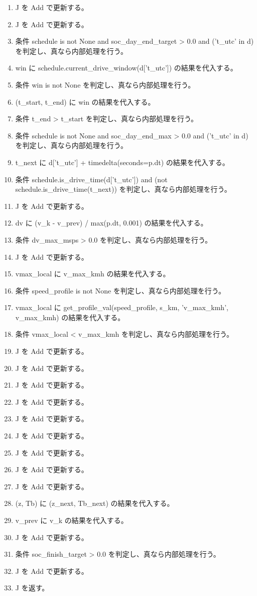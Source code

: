 \documentclass[a4paper,11pt]{article}
\begin{document}
\begin{enumerate}[leftmargin=1.8em]
\item   J を Add で更新する。
\item   J を Add で更新する。
\item   条件 schedule is not None and soc\_day\_end\_target > 0.0 and ('t\_utc' in d) を判定し、真なら内部処理を行う。
\item     win に schedule.current\_drive\_window(d['t\_utc']) の結果を代入する。
\item     条件 win is not None を判定し、真なら内部処理を行う。
\item       (t\_start, t\_end) に win の結果を代入する。
\item       条件 t\_end > t\_start を判定し、真なら内部処理を行う。
\item   条件 schedule is not None and soc\_day\_end\_max > 0.0 and ('t\_utc' in d) を判定し、真なら内部処理を行う。
\item     t\_next に d['t\_utc'] + timedelta(seconds=p.dt) の結果を代入する。
\item     条件 schedule.is\_drive\_time(d['t\_utc']) and (not schedule.is\_drive\_time(t\_next)) を判定し、真なら内部処理を行う。
\item       J を Add で更新する。
\item   dv に (v\_k - v\_prev) / max(p.dt, 0.001) の結果を代入する。
\item   条件 dv\_max\_msps > 0.0 を判定し、真なら内部処理を行う。
\item     J を Add で更新する。
\item   vmax\_local に v\_max\_kmh の結果を代入する。
\item   条件 speed\_profile is not None を判定し、真なら内部処理を行う。
\item     vmax\_local に get\_profile\_val(speed\_profile, s\_km, 'v\_max\_kmh', v\_max\_kmh) の結果を代入する。
\item   条件 vmax\_local < v\_max\_kmh を判定し、真なら内部処理を行う。
\item     J を Add で更新する。
\item   J を Add で更新する。
\item   J を Add で更新する。
\item   J を Add で更新する。
\item   J を Add で更新する。
\item   J を Add で更新する。
\item   J を Add で更新する。
\item   J を Add で更新する。
\item   J を Add で更新する。
\item   (z, Tb) に (z\_next, Tb\_next) の結果を代入する。
\item   v\_prev に v\_k の結果を代入する。
\item J を Add で更新する。
\item 条件 soc\_finish\_target > 0.0 を判定し、真なら内部処理を行う。
\item   J を Add で更新する。
\item J を返す。
            \end{enumerate}
\end{document}
